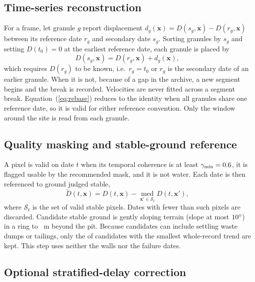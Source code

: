 \documentclass[aps,prd,twocolumn,superscriptaddress,nofootinbib,floatfix,preprintnumbers,10pt]{revtex4-2}
\begin{document}
\subsection{Time-series reconstruction}

For a frame, let granule $g$ report displacement $d_g(\bm{x}) = D(s_g,\bm{x}) - D(r_g,\bm{x})$ between its reference date $r_g$ and secondary date $s_g$. Sorting granules by $s_g$ and setting $D(t_0)=0$ at the earliest reference date, each granule is placed by
\begin{equation}
D(s_g,\bm{x}) = D(r_g,\bm{x}) + d_g(\bm{x}),
\label{eq:rebase}
\end{equation}
which requires $D(r_g)$ to be known, i.e.\ $r_g = t_0$ or $r_g$ is the secondary date of an earlier granule. When it is not, because of a gap in the archive, a new segment begins and the break is recorded. Velocities are never fitted across a segment break. Equation~(\ref{eq:rebase}) reduces to the identity when all granules share one reference date, so it is valid for either reference convention. Only the window around the site is read from each granule.

\subsection{Quality masking and stable-ground reference}

A pixel is valid on date $t$ when its temporal coherence is at least $\gamma_{\min}=0.6$, it is flagged usable by the recommended mask, and it is not water. Each date is then referenced to ground judged stable,
\begin{equation}
\tilde{D}(t,\bm{x}) = D(t,\bm{x}) - \operatorname*{med}_{\bm{x}'\in\mathcal{S}_t} D(t,\bm{x}'),
\label{eq:ref}
\end{equation}
where $\mathcal{S}_t$ is the set of valid stable pixels. Dates with fewer than \PStableMin{} such pixels are discarded. Candidate stable ground is gently sloping terrain (slope at most $10^\circ$) in a ring \PStableGap{} to \PStableWidth{}~m beyond the pit. Because candidates can include settling waste dumps or tailings, only the \PStableKeep{} of candidates with the smallest whole-record trend are kept. This step uses neither the walls nor the failure dates.

\subsection{Optional stratified-delay correction}\label{sec:strat}
\end{document}
